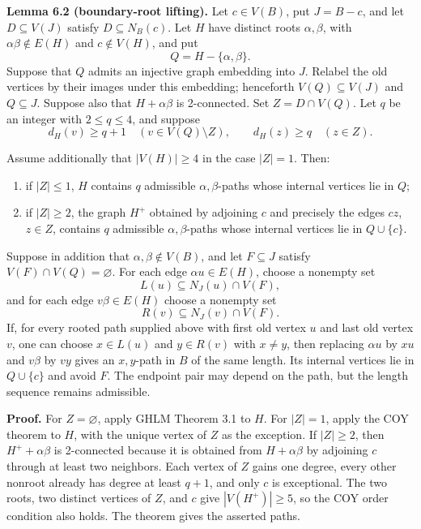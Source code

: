\documentclass[
  11pt]{article}
\providecommand{\tightlist}{%
  \setlength{\itemsep}{0pt}\setlength{\parskip}{0pt}}
\begin{document}

\textbf{Lemma 6.2 (boundary-root lifting).} Let \(c\in V(B)\), put
\(J=B-c\), and let \(D\subseteq V(J)\) satisfy \(D\subseteq N_B(c)\).
Let \(H\) have distinct roots \(\alpha,\beta\), with
\(\alpha\beta\notin E(H)\) and \(c\notin V(H)\), and put \[
 Q=H-\{\alpha,\beta\}.
\] Suppose that \(Q\) admits an injective graph embedding into \(J\).
Relabel the old vertices by their images under this embedding;
henceforth \(V(Q)\subseteq V(J)\) and \(Q\subseteq J\). Suppose also
that \(H+\alpha\beta\) is 2-connected. Set \(Z=D\cap V(Q)\). Let \(q\)
be an integer with \(2\le q\le4\), and suppose \[
 d_H(v)\ge q+1\quad(v\in V(Q)\setminus Z),
 \qquad
 d_H(z)\ge q\quad(z\in Z). \tag{6.1}
\]


Assume additionally that \(|V(H)|\ge4\) in the case \(|Z|=1\). Then:

\begin{enumerate}
\def\labelenumi{\arabic{enumi}.}
\tightlist
\item
  if \(|Z|\le1\), \(H\) contains \(q\) admissible \(\alpha,\beta\)-paths
  whose internal vertices lie in \(Q\);
\item
  if \(|Z|\ge2\), the graph \(H^+\) obtained by adjoining \(c\) and
  precisely the edges \(cz\), \(z\in Z\), contains \(q\) admissible
  \(\alpha,\beta\)-paths whose internal vertices lie in \(Q\cup\{c\}\).
\end{enumerate}

Suppose in addition that \(\alpha,\beta\notin V(B)\), and let
\(F\subseteq J\) satisfy \(V(F)\cap V(Q)=\varnothing\). For each edge
\(\alpha u\in E(H)\), choose a nonempty set \[
 L(u)\subseteq N_J(u)\cap V(F),
\] and for each edge \(v\beta\in E(H)\) choose a nonempty set \[
 R(v)\subseteq N_J(v)\cap V(F).
\] If, for every rooted path supplied above with first old vertex \(u\)
and last old vertex \(v\), one can choose \(x\in L(u)\) and
\(y\in R(v)\) with \(x\ne y\), then replacing \(\alpha u\) by \(xu\) and
\(v\beta\) by \(vy\) gives an \(x,y\)-path in \(B\) of the same length.
Its internal vertices lie in \(Q\cup\{c\}\) and avoid \(F\). The
endpoint pair may depend on the path, but the length sequence remains
admissible.

\textbf{Proof.} For \(Z=\varnothing\), apply GHLM Theorem 3.1 to \(H\).
For \(|Z|=1\), apply the COY theorem to \(H\), with the unique vertex of
\(Z\) as the exception. If \(|Z|\ge2\), then \(H^++\alpha\beta\) is
2-connected because it is obtained from \(H+\alpha\beta\) by adjoining
\(c\) through at least two neighbors. Each vertex of \(Z\) gains one
degree, every other nonroot already has degree at least \(q+1\), and
only \(c\) is exceptional. The two roots, two distinct vertices of
\(Z\), and \(c\) give \(|V(H^+)|\ge5\), so the COY order condition also
holds. The theorem gives the asserted paths.
\end{document}
